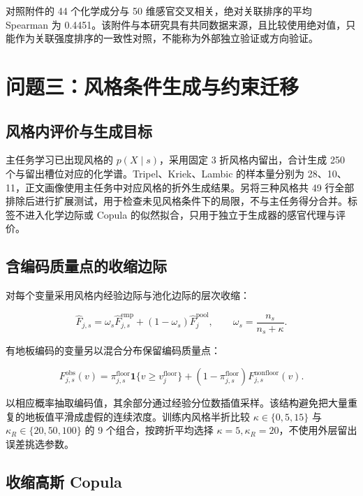 \documentclass[
  chinese,
  11pt,
]{article}
\begin{document}
对照附件的 44 个化学成分与 50 维感官交叉相关，绝对关联排序的平均
Spearman 为
0.4451。该附件与本研究具有共同数据来源，且比较使用绝对值，只能作为关联强度排序的一致性对照，不能称为外部独立验证或方向验证。

\section{问题三：风格条件生成与约束迁移}\label{ux95eeux9898ux4e09ux98ceux683cux6761ux4ef6ux751fux6210ux4e0eux7ea6ux675fux8fc1ux79fb}

\subsection{风格内评价与生成目标}\label{ux98ceux683cux5185ux8bc4ux4ef7ux4e0eux751fux6210ux76eeux6807}

主任务学习已出现风格的 \(p(X\mid s)\)，采用固定 3 折风格内留出，合计生成
250 个与留出槽位对应的化学谱。Tripel、Kriek、Lambic 的样本量分别为
28、10、11，正文画像使用主任务中对应风格的折外生成结果。另将三种风格共
49
行全部排除后进行扩展测试，用于检查未见风格条件下的局限，不与主任务得分合并。标签不进入化学边际或
Copula 的似然拟合，只用于独立于生成器的感官代理与评价。

\subsection{含编码质量点的收缩边际}\label{ux542bux7f16ux7801ux8d28ux91cfux70b9ux7684ux6536ux7f29ux8fb9ux9645}

对每个变量采用风格内经验边际与池化边际的层次收缩：

\[
\widehat F_{j,s}=\omega_s\widehat F^{\mathrm{emp}}_{j,s}+(1-\omega_s)\widehat F_j^{\mathrm{pool}},
\qquad \omega_s=\frac{n_s}{n_s+\kappa}.
\]

有地板编码的变量另以混合分布保留编码质量点：

\[
F_{j,s}^{\mathrm{obs}}(v)=\pi_{j,s}^{\mathrm{floor}}\mathbf1\{v\ge v_j^{\mathrm{floor}}\}
+(1-\pi_{j,s}^{\mathrm{floor}})F_{j,s}^{\mathrm{nonfloor}}(v).
\]

以相应概率抽取编码值，其余部分通过经验分位数插值采样。该结构避免把大量重复的地板值平滑成虚假的连续浓度。训练内风格半折比较
\(\kappa\in\{0,5,15\}\) 与 \(\kappa_R\in\{20,50,100\}\) 的 9
个组合，按跨折平均选择
\(\kappa=5,\kappa_R=20\)，不使用外层留出误差挑选参数。

\subsection{收缩高斯 Copula}\label{ux6536ux7f29ux9ad8ux65af-copula}
\end{document}
